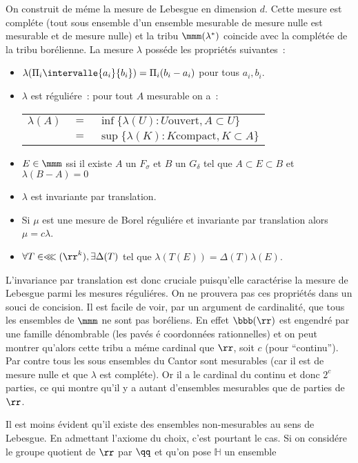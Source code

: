 On construit de méme la mesure de Lebesgue en dimension $d$. Cette mesure est compléte (tout sous ensemble d'un ensemble mesurable de
mesure nulle est mesurable et de mesure nulle) et la tribu $\mmm(\lambda^*)$ coincide avec la complétée de la tribu borélienne.
 La mesure $\lambda$ posséde les propriétés suivantes~:
\begin{itemize}
\item{} $\lambda(\Pi_i\intervalle{a_i}{b_i}) = \Pi_i(b_i-a_i)$ pour tous $a_i, b_i$.
\item{} $\lambda$ est réguliére~: pour tout $A$ mesurable on a~: \par
\begin{tabular}{lcl}
$\lambda(A)$& $=$&  $\inf\lbrace\lambda(U) : U \mathrm{ouvert}, A\subset U\rbrace$\\
            & $=$&  $\sup\lbrace\lambda(K) : K\mathrm{compact}, K\subset A\rbrace$
\end{tabular}
\item{} $E\in \mmm$ ssi il existe $A$ un $F_{\sigma}$ et $B$ un $G_{\delta}$ tel que $A\subset E\subset B$ et 
         $\lambda(B-A) = 0$
\item{} $\lambda$ est invariante par translation.
\item{} Si $\mu$ est une mesure de Borel réguliére et invariante par translation alors $\mu = c \lambda$.
\item{} $\forall T\in \lll({\rr}^k), \exists\Delta(T)$ tel que $\lambda(T(E)) = \Delta(T)\lambda(E)$.
\end{itemize}
L'invariance par translation est donc cruciale puisqu'elle caractérise la mesure de Lebesgue parmi les mesures 
réguliéres. On ne prouvera pas ces propriétés dans un souci de concision.
\medskip
\rmq Il est facile de voir, par un argument de cardinalité, que tous les ensembles de $\mmm$ ne sont pas boréliens.
En effet $\bbb(\rr)$ est engendré par une famille dénombrable (les pavés é coordonnées rationnelles) et on peut montrer
qu'alors cette tribu a méme cardinal que $\rr$, soit $c$ (pour ``continu''). Par contre tous les sous ensembles du Cantor
sont mesurables (car il est de mesure nulle et que $\lambda$ est compléte). Or il a le cardinal du continu et donc $2^c$
parties, ce qui montre qu'il y a autant d'ensembles mesurables que de parties de $\rr$.\par 
Il est moins évident qu'il existe des ensembles non-mesurables au sens de Lebesgue. En admettant l'axiome du choix, 
c'est pourtant le cas. Si on considére le groupe quotient de $\rr$ par $\qq$ et qu'on pose $\mathbb{H}$ un ensemble
